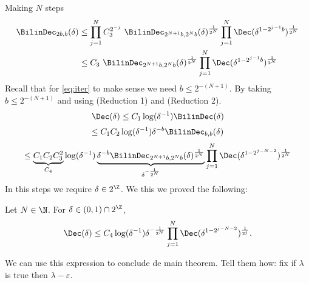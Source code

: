 Making $N$ steps
\begin{align}\label{eq:iter}
    \BilinDec_{2b,b}(\delta) &\leq \prod_{j=1}^{N} C_{3}^{2^{-j}}\,\,
    \BilinDec_{2^{N+1}b,2^{N}b}(\delta)^{\frac{1}{2^{N}}}\prod_{j=1}^{N} \Dec(\delta^{1-2^{j-1}b})^{\frac{1}{2^{N}}} \notag \\
    &\leq  C_3\,\,
    \BilinDec_{2^{N+1}b,2^{N}b}(\delta)^{\frac{1}{2^{N}}} \prod_{j=1}^{N} \Dec(\delta^{1-2^{j-1}b})^{\frac{1}{2^{N}}}
\end{align}
Recall that for \ref{eq:iter} to make sense we need $b\leq 2^{-(N+1)}$. By taking  $b\leq 2^{-(N+1)}$ and using (Reduction 1) and (Reduction 2).
\begin{equation}
    \Dec(\delta) \leq C_1 \log(\delta^{-1})\BilinDec(\delta)
\end{equation}
\begin{equation}
    \leq C_1 C_2 \log(\delta^{-1})\delta^{-b} \BilinDec_{b,b}(\delta)
\end{equation}
\begin{equation}
    \leq  \underbrace{C_1 C_2 C_{3}^{2}}_{C_4}\log(\delta^{-1})
    \underbrace{\delta^{-b} \BilinDec_{2^{N+1}b,2^{N}b}(\delta)^{\frac{1}{2^{N}}}}_{\delta^{-\frac{1}{2^{N}}}}\prod_{j=1}^{N} \Dec(\delta^{1-2^{j-N-2}})^{\frac{1}{2^{N}}}
\end{equation}
In this steps we require $\delta \in 2^{\Z}$. We this we proved the following:
\begin{lem}\label{lem: general iteration}
    Let $N \in \N$. For $\delta \in (0,1)\cap 2^{\Z}$,
    \begin{equation}\label{eq:pre std.decou.}
     \Dec(\delta)\leq  C_4 \log(\delta^{-1})
    \delta^{-\frac{1}{2^{N}}}\prod_{j=1}^{N} \Dec(\delta^{1-2^{j-N-2}})^{\frac{1}{2^{j}}}.
    \end{equation}
\end{lem}
\begin{rmk}
    We can use this expression to conclude de main theorem. Tell them how: fix if $\lambda$ is true then $\lambda -\varepsilon$.
\end{rmk}

